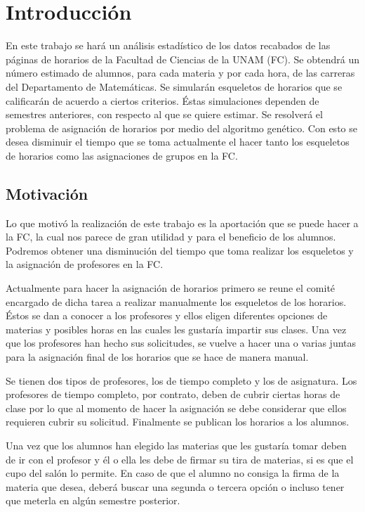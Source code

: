 \chapter{Introducción}

En este trabajo se hará un análisis estadístico de los datos recabados de las páginas de horarios de la Facultad de Ciencias de la UNAM (FC). Se obtendrá un número estimado de alumnos, para cada materia y por cada hora, de las carreras del Departamento de Matemáticas. Se simularán esqueletos de horarios que se calificarán de acuerdo a ciertos criterios. Éstas simulaciones dependen de semestres anteriores, con respecto al que se quiere estimar. Se resolverá el problema de asignación de horarios por medio del algoritmo genético. Con esto se desea disminuir el tiempo que se toma actualmente el hacer tanto los esqueletos de horarios como las asignaciones de grupos en la FC.

\section{Motivación}

Lo que motivó la realización de este trabajo es la aportación que se puede hacer a la FC, la cual nos parece de gran utilidad y para el beneficio de los alumnos. Podremos obtener una disminución del tiempo que toma realizar los esqueletos y la asignación de profesores en la FC.

Actualmente para hacer la asignación de horarios primero se reune el comité encargado de dicha tarea a realizar manualmente los esqueletos de los horarios. Éstos se dan a conocer a los profesores y ellos eligen diferentes opciones de materias y posibles horas en las cuales les gustaría impartir sus clases. Una vez que los profesores han hecho sus solicitudes, se vuelve a hacer una o varias juntas para la asignación final de los horarios que se hace de manera manual.

Se tienen dos tipos de profesores, los de tiempo completo y los de asignatura. Los profesores de tiempo completo, por contrato, deben de cubrir ciertas horas de clase por lo que al momento de hacer la asignación se debe considerar que ellos requieren cubrir su solicitud. Finalmente se publican los horarios a los alumnos.

Una vez que los alumnos han elegido las materias que les gustaría tomar deben de ir con el profesor y él o ella les debe de firmar su tira de materias, si es que el cupo del salón lo permite. En caso de que el alumno no consiga la firma de la materia que desea, deberá buscar una segunda o tercera opción o incluso tener que meterla en algún semestre posterior.

